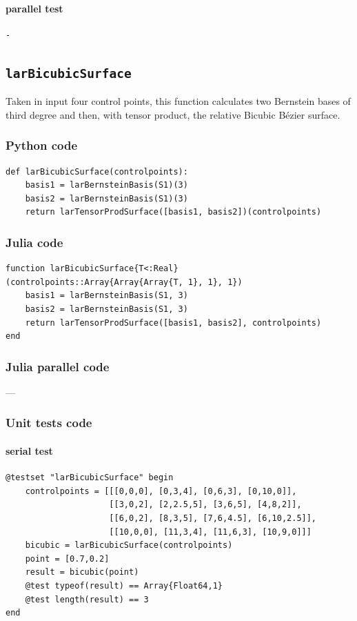 \documentclass[a4paper,11pt]{article}
\begin{document}
\paragraph{parallel test}
\begin{verbatim}
-
\end{verbatim}

\subsection{\texttt{larBicubicSurface}}

Taken in input four control points, this function calculates two Bernstein bases of third degree and then, with tensor product, the relative Bicubic B\'ezier surface.

\subsubsection{Python code}

\begin{verbatim}
def larBicubicSurface(controlpoints):
    basis1 = larBernsteinBasis(S1)(3)
    basis2 = larBernsteinBasis(S1)(3)
    return larTensorProdSurface([basis1, basis2])(controlpoints)
\end{verbatim}

\subsubsection{Julia code}

\begin{verbatim}
function larBicubicSurface{T<:Real}(controlpoints::Array{Array{Array{T, 1}, 1}, 1})
    basis1 = larBernsteinBasis(S1, 3)
    basis2 = larBernsteinBasis(S1, 3)
    return larTensorProdSurface([basis1, basis2], controlpoints)
end
\end{verbatim}

\subsubsection{Julia parallel code}
---

\subsubsection{Unit tests code}

\paragraph{serial test}
\begin{verbatim}
@testset "larBicubicSurface" begin
    controlpoints = [[[0,0,0], [0,3,4], [0,6,3], [0,10,0]],
                     [[3,0,2], [2,2.5,5], [3,6,5], [4,8,2]],
                     [[6,0,2], [8,3,5], [7,6,4.5], [6,10,2.5]],
                     [[10,0,0], [11,3,4], [11,6,3], [10,9,0]]]
    bicubic = larBicubicSurface(controlpoints)
    point = [0.7,0.2]
    result = bicubic(point)
    @test typeof(result) == Array{Float64,1}
    @test length(result) == 3
end
\end{verbatim}
\end{document}
